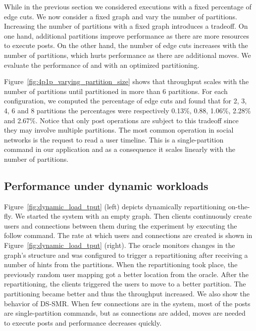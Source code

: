 While in the previous section we considered executions with a fixed percentage of edge cuts.
We now consider a fixed graph and vary the number of partitions.
Increasing the number of partitions with a fixed graph introduces a tradeoff.
On one hand, additional partitions improve performance as there are more resources to execute posts.
On the other hand, the number of edge cuts increases with the number of partitions, which hurts performance as there are additional moves.
We evaluate the performance of \dynastar and \ssmr with an optimized partitioning.%

Figure~\ref{fig:4p1p_varying_partition_size} shows that throughput scales with the number of partitions until partitioned in more than 6 partitions.
For each configuration, we computed the percentage of edge cuts and found that for 2, 3, 4, 6 and 8 partitions the percentages were respectively 
0.13\%, 0.88, 1.06\%, 2.28\% and 2.67\%.
Notice that only post operations are subject to this tradeoff since they may involve multiple partitions.
The most common operation in social networks is the request to read a user timeline. This is a single-partition
command in our application and as a consequence it scales linearly with the number of partitions.


\subsection{Performance under dynamic workloads}

Figure~\ref{fig:dynamic_load_tput} (left) depicts dynamically repartitioning
on-the-fly.  We started the system with an empty graph. Then clients
continuously create users and connections between them during the experiment
by executing the follow command.
The rate at which users and connections are created is shown in Figure~\ref{fig:dynamic_load_tput} (right).
The oracle monitors changes in the
graph's structure and was configured to trigger a repartitioning after receiving a number of hints
from the partitions.
When the repartitioning took place, the previously random user mapping got a better location from the oracle.
After the repartitioning, the clients triggered the users to move to a better partition. 
The partitioning became better and thus the throughput increased.
We also show the behavior of DS-SMR.
When few connections are in the system, most of the posts are single-partition commands, but as connections are added, moves are needed to execute posts and performance decreases quickly.

